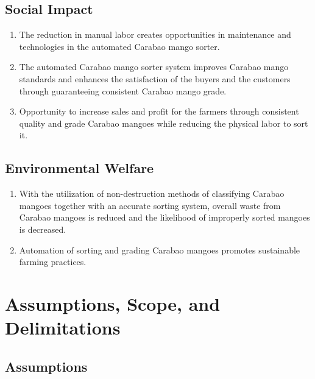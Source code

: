 \subsection{Social Impact}

\begin{enumerate}
	\item The reduction in manual labor creates opportunities in maintenance and
	 technologies in the automated Carabao mango sorter.
	
	\item The automated Carabao mango sorter system improves Carabao mango 
	standards and enhances the satisfaction of the buyers and the customers through
	 guaranteeing consistent Carabao mango grade.
	
	\item Opportunity to increase sales and profit for the farmers through consistent 
	quality and grade Carabao mangoes while reducing the physical labor to sort it.
\end{enumerate}

\subsection{Environmental Welfare}

\begin{enumerate}
	\item With the utilization of non-destruction methods of classifying Carabao mangoes together with an
	 accurate sorting system, overall waste from Carabao mangoes is reduced and the likelihood
	  of improperly sorted mangoes is decreased.
	
	\item Automation of sorting and grading Carabao mangoes promotes sustainable farming practices.
	
\end{enumerate}



\section{Assumptions, Scope, and Delimitations}

\subsection{Assumptions}

